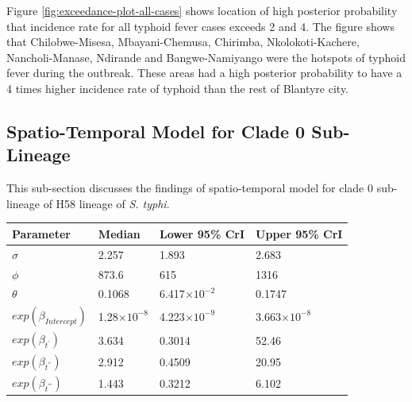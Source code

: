 Figure \ref{fig:exceedance-plot-all-cases} shows location of high posterior probability that incidence rate for all typhoid fever cases exceeds 2 and 4. The figure shows that Chilobwe-Misesa, Mbayani-Chemusa, Chirimba, Nkolokoti-Kachere, Nancholi-Manase, Ndirande and Bangwe-Namiyango were the hotspots of typhoid fever during the outbreak. These areas had a high posterior probability to have a 4 times higher incidence rate of typhoid than the rest of Blantyre city.

\subsection{Spatio-Temporal Model for Clade 0 Sub-Lineage}

This sub-section discusses the findings of spatio-temporal model for clade 0 sub-lineage of H58 lineage of \textit{S. typhi}.

\newpage

\addtocounter{table}{-1}
\begin{spacing}{0.9}
     \label{tab:lgcp-model-zero-cases}
    \begin{longtable}{p{1.3in}p{1.3in}p{1.3in}p{1.3in}}
        \toprule
        Parameter                & Median              & Lower 95\% CrI       & Upper 95\% CrI       \\ \midrule
        $\sigma$                 & 2.257               & 1.893                & 2.683                \\
        $\phi$                   & 873.6               & 615                  & 1316                 \\
        $\theta$                 & 0.1068              & 6.417$\times10^{-2}$ & 0.1747               \\
        $exp(\beta_{Intercept})$ & 1.28$\times10^{-8}$ & 4.223$\times10^{-9}$ & 3.663$\times10^{-8}$ \\
        $exp(\beta_{t^{'}})$     & 3.634               & 0.3014               & 52.46                \\
        $exp(\beta_{t^{''}})$    & 2.912               & 0.4509               & 20.95                \\
        $exp(\beta_{t^{'''}})$   & 1.443               & 0.3212               & 6.102                \\
        \bottomrule
    \end{longtable}
\end{spacing}

